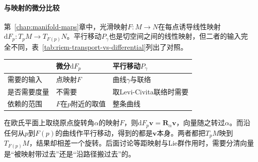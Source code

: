 \paragraph{与映射的微分比较}
第~\ref{chap:manifold-maps}章中，光滑映射$F:M\to N$在每点诱导线性映射$\mathrm dF_p:T_pM\to T_{F(p)}N$。平行移动$P_\gamma$也是切空间之间的线性映射，但二者的输入完全不同，表~\ref{tab:riem-transport-vs-differential}列出了对照。

\begin{BookInlineTable}
  \centering
  \begin{tabular}{lll}
    \toprule
    & 微分$\mathrm dF_p$ & 平行移动$P_\gamma$\\
    \midrule
    需要的输入 & 点映射$F$ & 曲线$\gamma$与联络\\
    是否需要度量 & 不需要 & 取Levi-Civita联络时需要\\
    依赖的范围 & $F$在$p$附近的取值 & 整条曲线\\
    \bottomrule
  \end{tabular}
  \caption{切空间之间的两种线性映射。}
  \label{tab:riem-transport-vs-differential}
\end{BookInlineTable}

在欧氏平面上取绕原点旋转角$\alpha$的映射$F$，则$\mathrm dF_p\bm v=\bm R_\alpha\bm v$，向量随之转过$\alpha$。而沿任何从$p$到$F(p)$的曲线作平行移动，得到的都是$\bm v$本身。两者都把$T_pM$映到$T_{F(p)}M$，结果却相差一个旋转。后面讨论等距映射与Lie群作用时，需要分清向量是“被映射带过去”还是“沿路径搬过去”的。
